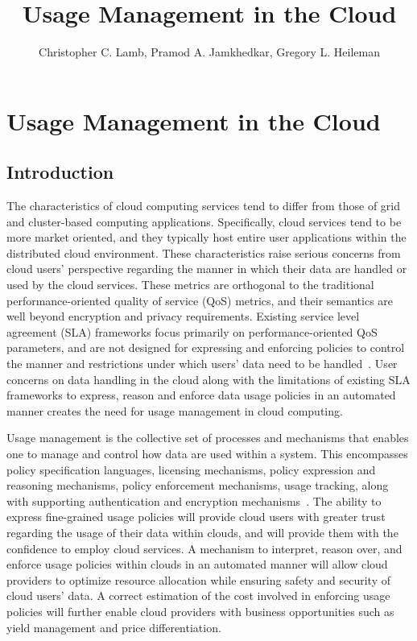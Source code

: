 \documentclass[10pt,letterpaper]{book}
\author{Christopher C. Lamb, Pramod A. Jamkhedkar, Gregory L. Heileman}
\title{Usage Management in the Cloud}
\begin{document}
\maketitle
\tableofcontents
\chapter{Usage Management in the Cloud}
\section{Introduction}
The characteristics of cloud computing services tend to differ from those of grid and cluster-based computing applications.  Specifically, cloud services tend to be more market oriented, and they typically host entire user applications within the distributed cloud environment. These characteristics raise serious concerns from cloud users' perspective regarding the manner in which their data are handled or used by the cloud services. These metrics are orthogonal to the traditional performance-oriented quality of service (QoS) metrics, and their semantics are well beyond encryption and privacy requirements. Existing service level agreement (SLA) frameworks focus primarily on performance-oriented QoS parameters, and are not designed for expressing and enforcing policies to control the manner and restrictions under which users' data need to be handled~\cite{WSA, WSLA, WSP,PaRaSh:09}. User concerns on data handling in the cloud along with the limitations of existing SLA frameworks to express, reason and enforce data usage policies in an automated manner creates the need for usage management in cloud computing. 
 
Usage management is the collective set of processes and mechanisms that enables one to manage and control how data are
used within a system. This encompasses policy specification languages, licensing mechanisms, policy expression and reasoning mechanisms, policy enforcement mechanisms, usage tracking, along with supporting authentication and encryption mechanisms~\cite{PaSa:04,JaHeLa:10}. The ability to express fine-grained usage policies will provide cloud users with greater trust regarding the usage of their data within clouds, and will provide them with the confidence to employ cloud services. A mechanism to interpret, reason over, and enforce usage policies within clouds in an automated manner will allow cloud providers to optimize resource allocation while ensuring safety and security of cloud users' data. A correct estimation of the cost involved in enforcing usage policies will further enable cloud providers with business opportunities such as yield management and price differentiation. 
\end{document}
